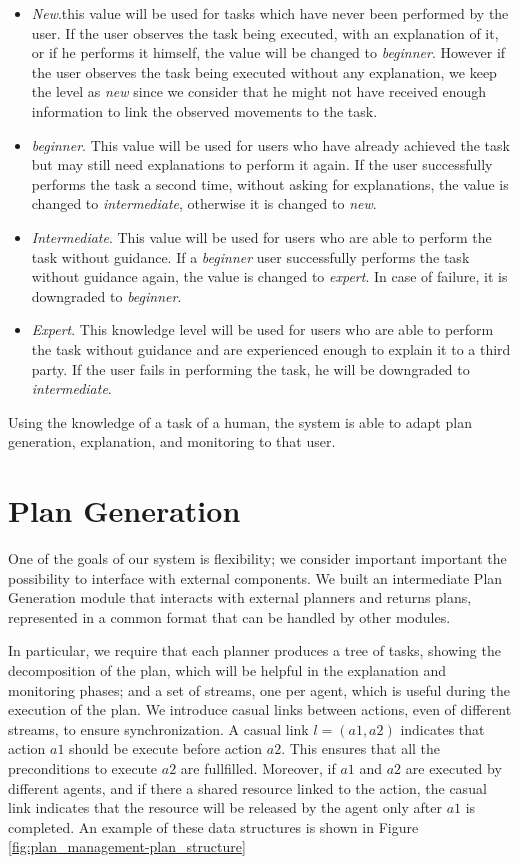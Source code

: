\begin{itemize}
\item \textit{New}.this value will be used for tasks which have never been performed by the user. If the user observes the task being executed, with an explanation of it, or if he performs it himself, the value will be changed to \textit{beginner}. However if the user observes the task being executed without any explanation, we keep the level as \textit{new} since we consider that he might not have received enough information to link the observed movements to the task.
\item \textit{beginner}. This value will be used for users who have already achieved the task but may still need explanations to perform it again. If the user successfully performs the task a second time, without asking for explanations, the value is changed to \textit{intermediate}, otherwise it is changed to \textit{new}.
\item \textit{Intermediate}. This value will be used for users who are able to perform the task without guidance. If a \textit{beginner} user successfully performs the task without guidance again, the value is changed to \textit{expert}. In case of failure, it is downgraded to \textit{beginner}.
\item \textit{Expert}. This knowledge level will be used for users who are able to perform the task without guidance and are experienced enough to explain it to a third party. If the user fails in performing the task, he will be downgraded to \textit{intermediate}.
\end{itemize}

Using the knowledge of a task of a human, the system is able to adapt plan generation, explanation, and monitoring to that user.

\section{Plan Generation}
\label{sec-plan_management-plan_generation}
One of the goals of our system is flexibility; we consider important important the possibility to interface with external components. We built an intermediate Plan Generation module that interacts with external planners and returns plans, represented in a common format that can be handled by other modules. 

In particular, we require that each planner produces a tree of tasks, showing the decomposition of the plan, which will be helpful in the explanation and monitoring phases; and a set of streams, one per agent, which is useful during the execution of the plan. We introduce casual links between actions, even of different streams, to ensure synchronization. A casual link $l=(a1,a2)$ indicates that action $a1$ should be execute before action $a2$. This ensures that all the preconditions to execute $a2$ are fullfilled. Moreover, if $a1$ and $a2$ are executed by different agents, and if there a shared resource linked to the action, the casual link indicates that the resource will be released by the agent only after $a1$ is completed. An example of these data structures is shown in Figure \ref{fig:plan_management-plan_structure}

